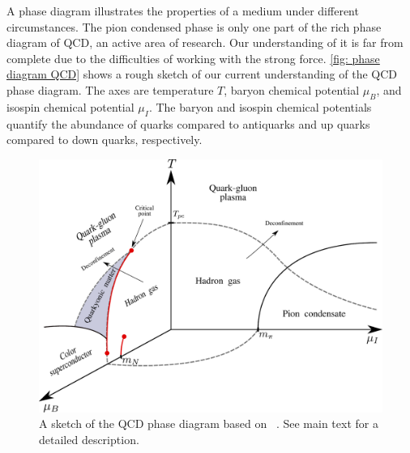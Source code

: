 A phase diagram illustrates the properties of a medium under different circumstances.
The pion condensed phase is only one part of the rich phase diagram of QCD, an active area of research.
Our understanding of it is far from complete due to the difficulties of working with the strong force.
\autoref{fig: phase diagram QCD} shows a rough sketch of our current understanding of the QCD phase diagram.
The axes are temperature $T$, baryon chemical potential $\mu_B$, and isospin chemical potential $\mu_I$.
The baryon and isospin chemical potentials quantify the abundance of quarks compared to antiquarks and up quarks compared to down quarks, respectively.

\begin{figure}[!htb]
    \centering
    \includegraphics[width=.85\textwidth]{figurer/phase_diagram2.pdf}
    \caption{
        A sketch of the QCD phase diagram based on
        ~\autocite{fukushimaPhaseDiagramDense2010,andronicHadronProductionUltrarelativistic2010,baymHadronsQuarksNeutron2018}.
        See main text for a detailed description.
        }
    \label{fig: phase diagram QCD}
\end{figure}


